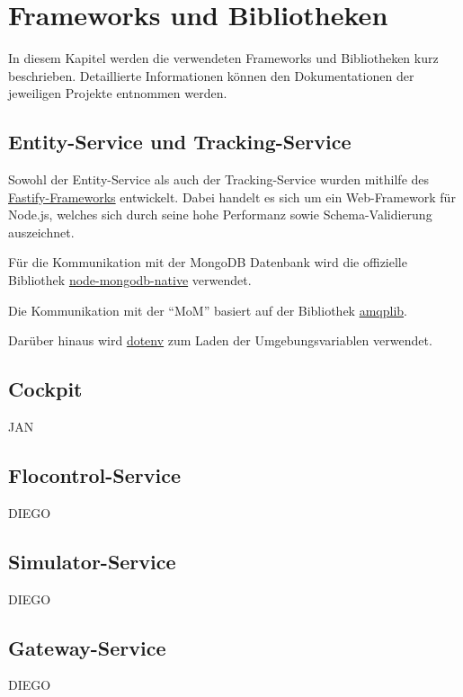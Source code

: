 \section{Frameworks und Bibliotheken}

In diesem Kapitel werden die verwendeten Frameworks und Bibliotheken kurz beschrieben.
Detaillierte Informationen können den Dokumentationen der jeweiligen Projekte entnommen werden.

\subsection{Entity-Service und Tracking-Service}

Sowohl der Entity-Service als auch der Tracking-Service wurden mithilfe des \href{https://www.fastify.io}{Fastify-Frameworks} entwickelt.
Dabei handelt es sich um ein Web-Framework für Node.js, welches sich durch seine hohe Performanz sowie Schema-Validierung auszeichnet.

Für die Kommunikation mit der MongoDB Datenbank wird die offizielle Bibliothek \href{https://github.com/mongodb/node-mongodb-native}{node-mongodb-native} verwendet.

Die Kommunikation mit der \enquote{MoM} basiert auf der Bibliothek \href{https://amqp-node.github.io/amqplib/}{amqplib}.

Darüber hinaus wird \href{https://github.com/motdotla/dotenv}{dotenv} zum Laden der Umgebungsvariablen verwendet.

\subsection{Cockpit}
JAN

\subsection{Flocontrol-Service}
DIEGO

\subsection{Simulator-Service}
DIEGO

\subsection{Gateway-Service}
DIEGO
